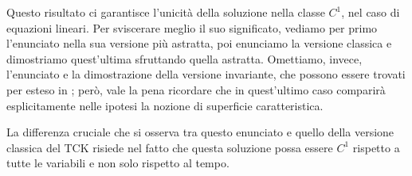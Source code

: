 Questo risultato ci garantisce l'unicità della soluzione nella classe $C^1$, nel caso di equazioni lineari. Per sviscerare meglio il suo significato, vediamo per primo l'enunciato nella sua versione più astratta, poi enunciamo la versione classica e dimostriamo quest'ultima sfruttando quella astratta. Omettiamo, invece, l'enunciato e la dimostrazione della versione invariante, che possono essere trovati per esteso in \cite[cap.21]{Treves}; però, vale la pena ricordare che in quest'ultimo caso comparirà esplicitamente nelle ipotesi la nozione di superficie caratteristica.

\begin{theorem}
\end{theorem}

\begin{theorem}
\end{theorem}

\begin{remark}
La differenza cruciale che si osserva tra questo enunciato e quello della versione classica del TCK risiede nel fatto che questa soluzione possa essere $C^1$ rispetto a tutte le variabili e non solo rispetto al tempo.
\end{remark}

